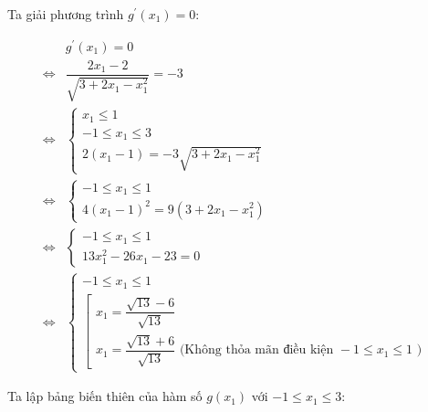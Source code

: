 \documentclass[14pt, a4paper]{article}
\theoremstyle{sltheorem}
\theoremstyle{soltheorem}
\begin{document}
    Ta giải phương trình $g^{\prime}(x_1) = 0$:

    \begin{equation*}
        \begin{aligned}
            &g^{\prime}(x_1) = 0 \\
            \Leftrightarrow &\dfrac{2 x_1 - 2}{\sqrt{3 + 2x_1 - x_1^2}} = -3 \\
            \Leftrightarrow &\begin{cases}
                x_1 \leq 1 \\
                -1 \leq x_1 \leq 3 \\
                2(x_1 - 1) = -3\sqrt{3 + 2x_1 - x_1^2}
            \end{cases} \\
            \Leftrightarrow & \begin{cases}
                -1 \leq x_1 \leq 1 \\
                4(x_1 - 1)^2 = 9(3 + 2x_1 - x_1^2)
            \end{cases} \\
            \Leftrightarrow & \begin{cases}
                -1 \leq x_1 \leq 1 \\
                13x_1^2 - 26 x_1 - 23 = 0
            \end{cases}\\
            \Leftrightarrow & \begin{cases}
                -1 \leq x_1 \leq 1 \\
                \left [ \begin{array}{l} x_1 = \dfrac{\sqrt{13} - 6}{\sqrt{13}} \\ x_1 = \dfrac{\sqrt{13} + 6}{\sqrt{13}} \text{ (Không thỏa mãn điều kiện } -1 \leq x_1 \leq 1 \text{ )} \end{array}\right.
            \end{cases}
        \end{aligned}
    \end{equation*}

    Ta lập bảng biến thiên của hàm số $g(x_1)$ với $-1 \leq x_1 \leq 3$:

\end{document}
